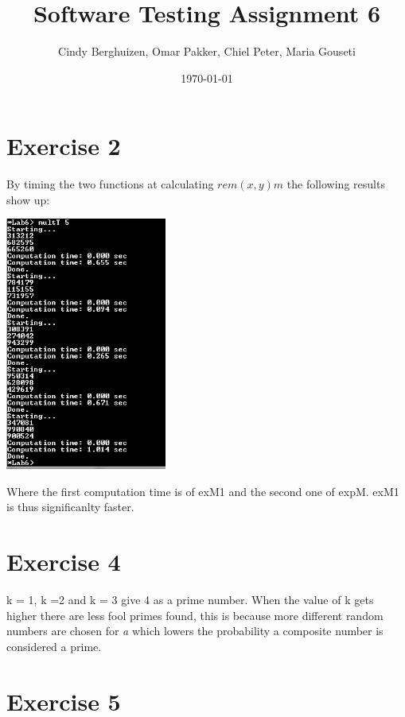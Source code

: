 \documentclass{article}
\begin{document}
\setlength{\parindent}{0cm}
\title{Software Testing Assignment 6}
\author{Cindy Berghuizen, Omar Pakker, Chiel Peter,  Maria Gouseti}
\date{\today}
\maketitle

\section*{Exercise 2}


\newpage
By timing the two functions at calculating $ rem(x,y) m$ the following results show up:

\includegraphics[width= 200px]{snippet}

Where the first computation time is of exM1 and the second one of expM. exM1 is thus significanlty faster.

\section*{Exercise 4}



k = 1, k =2 and k = 3 give 4 as a prime number. When the value of k gets higher there are less fool primes found, this is because more different random numbers are chosen for \emph{a} which lowers the probability a composite number is considered a prime. 

\vspace{0.5cm}
\section*{Exercise 5}
\end{document}
